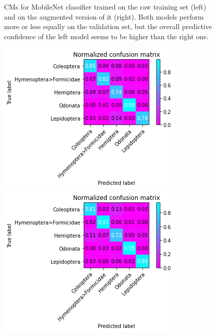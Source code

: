 \begin{figure}
\begin{multicols}{2}
\begin{minipage}{.45\textwidth}
        \end{minipage}
    \end{multicols}
    \caption{CMs for MobileNet classifier trained on the raw training set (left) and on the augmented version of it (right).
    Both models perform more or less equally on the validation set, but the overall predictive confidence of the left model seems to be higher than the right one.}
    \label{fig:classification-mobilenet-conf}
\end{figure}
\begin{figure}
    \centering
    \begin{multicols}{2}
        \begin{minipage}{.45\textwidth}
            \includegraphics[width=\textwidth]{images/classification-vgg.png}
        \end{minipage}
        \columnbreak
        \begin{minipage}{.45\textwidth}
            \includegraphics[width=\textwidth]{images/augmented-classification-vgg.png}

\end{minipage}
\end{multicols}
\end{figure}

